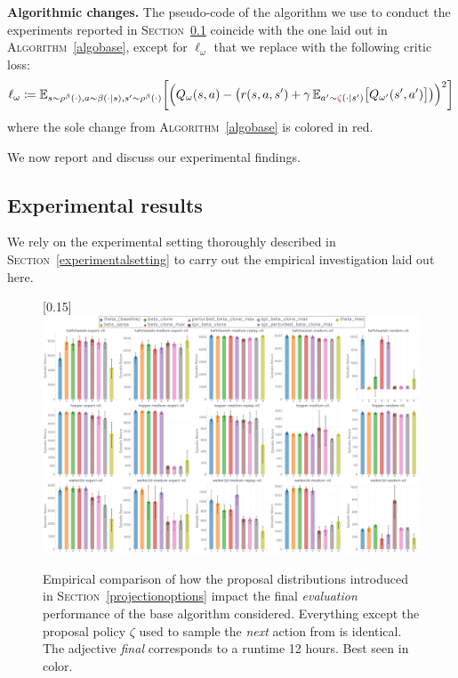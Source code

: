 \textbf{Algorithmic changes.}
The pseudo-code of the algorithm we use to conduct the experiments reported in \textsc{Section}~\ref{peresults}
coincide with the one laid out in \textsc{Algorithm}~\ref{algobase},
except for $\ell_\omega$ that we replace with the following critic loss:
\begin{align}
\ell_\omega \coloneqq
\mathbb{E}_{s \sim \rho^\beta(\cdot), a \sim \beta(\cdot | s), s' \sim \rho^\beta(\cdot)}
\bigg[
\Big(
Q_\omega(s,a) -
\big(
r(s, a, s') + \gamma \, \mathbb{E}_{a' \sim \textcolor{red}{\zeta}(\cdot | s')}
\big[
Q_{\omega'}(s',a')
\big]
\big)
\Big)^2
\bigg]
\end{align}
where the sole change from \textsc{Algorithm}~\ref{algobase} is colored in red.

We now report and discuss our experimental findings.

\subsection{Experimental results}
\label{peresults}
We rely on the experimental setting thoroughly described in \textsc{Section}~\ref{experimentalsetting}
to carry out the empirical investigation laid out here.

\begin{figure}[!h]
  \center\scalebox{0.15}[0.15]{\includegraphics{Plots/next/plots_main_eval_env_ret_barplot.pdf}}
  \caption{Empirical comparison of how the proposal distributions introduced
  in \textsc{Section}~\ref{projectionoptions}
  impact the final \emph{evaluation} performance of the base algorithm considered.
  Everything except the proposal policy $\zeta$ used to sample the \textit{next} action from is identical.
  The adjective \textit{final} corresponds to a runtime 12 hours. Best seen in color.}
  \label{next:barplot}
\end{figure}


